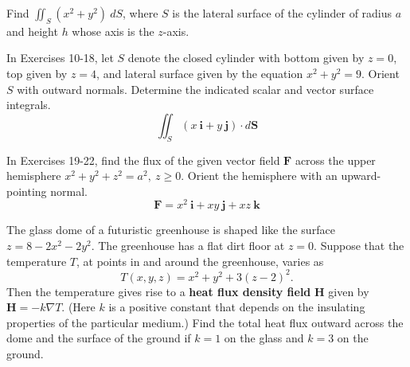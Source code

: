 \documentclass[12pt,letterpaper]{hmcpset}
\renewcommand{\bf}[1]{\mathbf{#1}}
\begin{document}

\begin{problem}[Colley 7.2.6]
    Find $\iint_S(x^2+y^2)~dS$, where $S$ is the lateral surface of
    the cylinder of radius $a$ and height $h$ whose axis is the
    $z$-axis.
\end{problem}
\begin{solution}
    \vfill
\end{solution}
\newpage

\begin{problem}[Colley 7.2.14]
    In Exercises 10-18, let $S$ denote the closed cylinder with bottom
    given by $z=0$, top given by $z=4$, and lateral surface given by
    the equation $x^2+y^2=9$. Orient $S$ with outward
    normals. Determine the indicated scalar and vector surface
    integrals.
    \[
        \iint_S(x~\bf{i}+y~\bf{j})\cdot d\bf{S}
    \]
\end{problem}
\begin{solution}
    \vfill
\end{solution}
\newpage

\begin{problem}[Colley 7.2.22]
    In Exercises 19-22, find the flux of the given vector field
    $\bf{F}$ across the upper hemisphere
    $x^2+y^2+z^2=a^2,~z\geq0$. Orient the hemisphere with an
    upward-pointing normal.
    \[
        \bf{F}=x^2~\bf{i}+xy~\bf{j}+xz~\bf{k}
    \]
\end{problem}
\begin{solution}
    \vfill
\end{solution}
\newpage

\begin{problem}[Colley 7.2.28]
    The glass dome of a futuristic greenhouse is shaped like the
    surface $z=8-2x^2-2y^2$. The greenhouse has a flat dirt floor at
    $z=0$. Suppose that the temperature $T$, at points in and around
    the greenhouse, varies as
    \[
        T(x,y,z)=x^2+y^2+3(z-2)^2.
    \]
    Then the temperature gives rise to a \textbf{heat flux density
    field} $\bf{H}$ given by $\bf{H}=-k\nabla T$. (Here $k$ is a
    positive constant that depends on the insulating properties of the
    particular medium.) Find the total heat flux outward across the
    dome and the surface of the ground if $k=1$ on the glass and $k=3$
    on the ground.
\end{problem}
\begin{solution}
    \vfill
\end{solution}
\newpage
\end{document}
